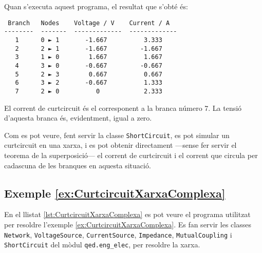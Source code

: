 

Quan s'executa aquest programa, el resultat que s'obté és:
\lstset{
	language=,
	numbers=none,
	frame=none
}
\begin{lstlisting}
 Branch   Nodes    Voltage / V    Current / A
--------  -------  -------------  -------------
   1      0 ► 1       -1.667          3.333
   2      2 ► 1       -1.667         -1.667
   3      1 ► 0        1.667          1.667
   4      3 ► 0       -0.667         -0.667
   5      2 ► 3        0.667          0.667
   6      3 ► 2       -0.667          1.333
   7      2 ► 0          0            2.333
\end{lstlisting}

El corrent de curtcircuit és el corresponent a la branca número 7. La tensió d'aquesta branca és, evidentment, igual a zero.

Com es pot veure, fent servir la classe   \texttt{ShortCircuit}, es pot simular  un curtcircuit en una xarxa, i es pot obtenir directament ---sense fer servir el teorema de la superposició--- el corrent de curtcircuit i el corrent que circula per cadascuna de les branques en aquesta situació.

\hypertarget{exemple:CurtcircuitXarxaComplexa}{\subsection{Exemple \ref*{ex:CurtcircuitXarxaComplexa} \CurtcircuitXarxaComplexa}}
En el llistat \vref{lst:CurtcircuitXarxaComplexa} es pot veure el programa utilitzat per resoldre l'exemple \vref{ex:CurtcircuitXarxaComplexa}. Es fan servir les classes \texttt{Network},    \texttt{VoltageSource}, \texttt{CurrentSource},  \texttt{Impedance}, \texttt{MutualCoupling} i \texttt{ShortCircuit} del mòdul \texttt{qed.eng\_elec},  per resoldre la xarxa.


\break



